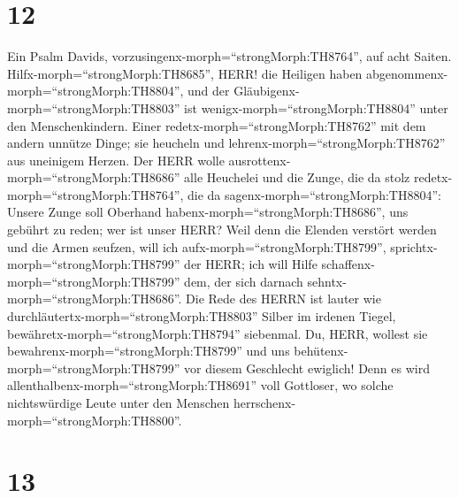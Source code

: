 \hypertarget{section-11}{%
\section{12}\label{section-11}}

 Ein Psalm Davids,
vorzusingenx-morph=``strongMorph:TH8764'', auf acht Saiten.
Hilfx-morph=``strongMorph:TH8685'', HERR! die Heiligen haben
abgenommenx-morph=``strongMorph:TH8804'', und der
Gläubigenx-morph=``strongMorph:TH8803'' ist
wenigx-morph=``strongMorph:TH8804'' unter den Menschenkindern.
 Einer redetx-morph=``strongMorph:TH8762'' mit dem andern
unnütze Dinge; sie heucheln und lehrenx-morph=``strongMorph:TH8762'' aus
uneinigem Herzen.  Der HERR wolle
ausrottenx-morph=``strongMorph:TH8686'' alle Heuchelei und die Zunge,
die da stolz redetx-morph=``strongMorph:TH8764'',  die da
sagenx-morph=``strongMorph:TH8804'': Unsere Zunge soll Oberhand
habenx-morph=``strongMorph:TH8686'', uns gebührt zu reden; wer ist unser
HERR?  Weil denn die Elenden verstört werden und die Armen
seufzen, will ich aufx-morph=``strongMorph:TH8799'',
sprichtx-morph=``strongMorph:TH8799'' der HERR; ich will Hilfe
schaffenx-morph=``strongMorph:TH8799'' dem, der sich darnach
sehntx-morph=``strongMorph:TH8686''.  Die Rede des HERRN ist
lauter wie durchläutertx-morph=``strongMorph:TH8803'' Silber im irdenen
Tiegel, bewähretx-morph=``strongMorph:TH8794'' siebenmal. 
Du, HERR, wollest sie bewahrenx-morph=``strongMorph:TH8799'' und uns
behütenx-morph=``strongMorph:TH8799'' vor diesem Geschlecht ewiglich!
 Denn es wird allenthalbenx-morph=``strongMorph:TH8691''
voll Gottloser, wo solche nichtswürdige Leute unter den Menschen
herrschenx-morph=``strongMorph:TH8800''.

\hypertarget{section-12}{%
\section{13}\label{section-12}}


